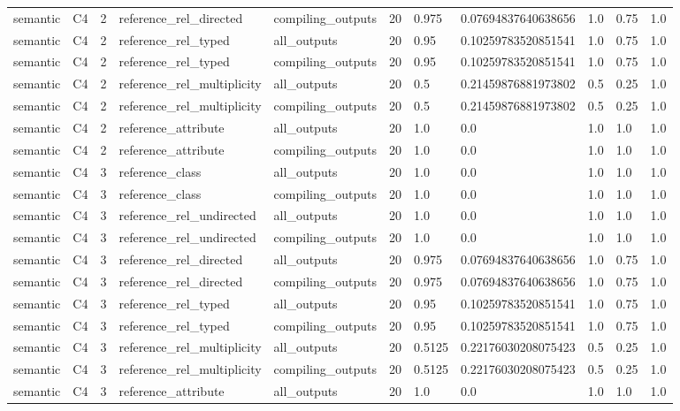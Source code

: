 \begin{tabular}{lllllllllll}
semantic & C4 & 2 & reference\_rel\_directed & compiling\_outputs & 20 & 0.975 & 0.07694837640638656 & 1.0 & 0.75 & 1.0 \\
semantic & C4 & 2 & reference\_rel\_typed & all\_outputs & 20 & 0.95 & 0.10259783520851541 & 1.0 & 0.75 & 1.0 \\
semantic & C4 & 2 & reference\_rel\_typed & compiling\_outputs & 20 & 0.95 & 0.10259783520851541 & 1.0 & 0.75 & 1.0 \\
semantic & C4 & 2 & reference\_rel\_multiplicity & all\_outputs & 20 & 0.5 & 0.21459876881973802 & 0.5 & 0.25 & 1.0 \\
semantic & C4 & 2 & reference\_rel\_multiplicity & compiling\_outputs & 20 & 0.5 & 0.21459876881973802 & 0.5 & 0.25 & 1.0 \\
semantic & C4 & 2 & reference\_attribute & all\_outputs & 20 & 1.0 & 0.0 & 1.0 & 1.0 & 1.0 \\
semantic & C4 & 2 & reference\_attribute & compiling\_outputs & 20 & 1.0 & 0.0 & 1.0 & 1.0 & 1.0 \\
semantic & C4 & 3 & reference\_class & all\_outputs & 20 & 1.0 & 0.0 & 1.0 & 1.0 & 1.0 \\
semantic & C4 & 3 & reference\_class & compiling\_outputs & 20 & 1.0 & 0.0 & 1.0 & 1.0 & 1.0 \\
semantic & C4 & 3 & reference\_rel\_undirected & all\_outputs & 20 & 1.0 & 0.0 & 1.0 & 1.0 & 1.0 \\
semantic & C4 & 3 & reference\_rel\_undirected & compiling\_outputs & 20 & 1.0 & 0.0 & 1.0 & 1.0 & 1.0 \\
semantic & C4 & 3 & reference\_rel\_directed & all\_outputs & 20 & 0.975 & 0.07694837640638656 & 1.0 & 0.75 & 1.0 \\
semantic & C4 & 3 & reference\_rel\_directed & compiling\_outputs & 20 & 0.975 & 0.07694837640638656 & 1.0 & 0.75 & 1.0 \\
semantic & C4 & 3 & reference\_rel\_typed & all\_outputs & 20 & 0.95 & 0.10259783520851541 & 1.0 & 0.75 & 1.0 \\
semantic & C4 & 3 & reference\_rel\_typed & compiling\_outputs & 20 & 0.95 & 0.10259783520851541 & 1.0 & 0.75 & 1.0 \\
semantic & C4 & 3 & reference\_rel\_multiplicity & all\_outputs & 20 & 0.5125 & 0.22176030208075423 & 0.5 & 0.25 & 1.0 \\
semantic & C4 & 3 & reference\_rel\_multiplicity & compiling\_outputs & 20 & 0.5125 & 0.22176030208075423 & 0.5 & 0.25 & 1.0 \\
semantic & C4 & 3 & reference\_attribute & all\_outputs & 20 & 1.0 & 0.0 & 1.0 & 1.0 & 1.0 \\

\end{tabular}
